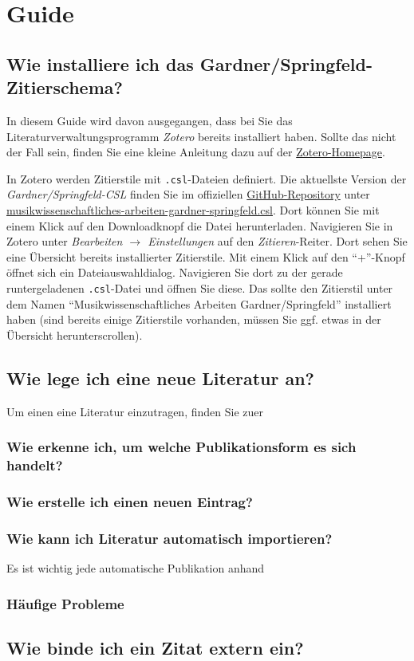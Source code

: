 \section{Guide}\label{guide}
\subsection{Wie installiere ich das Gardner/Springfeld-Zitierschema?}
In diesem Guide wird davon ausgegangen, dass bei Sie das Literaturverwaltungsprogramm \textit{Zotero} bereits installiert haben. Sollte das nicht der Fall sein, finden Sie eine kleine Anleitung dazu auf der \href{https://www.zotero.org/support/installation}{Zotero-Homepage}.

In Zotero werden Zitierstile mit \texttt{.csl}-Dateien definiert.
Die aktuellste Version der \textit{Gardner/Springfeld-CSL} finden Sie im offiziellen \href{https://github.com/digimuwi/MWA_csl}{GitHub-Re\-po\-si\-to\-ry}
unter
\href{https://github.com/digimuwi/MWA_csl/blob/main/musikwissenschaftliches-arbeiten-gardner-springfeld.csl}{musik\-wissen\-schaft\-liches-ar\-bei\-ten-gard\-ner-spring\-feld.csl}.
Dort k\"onnen Sie mit einem Klick auf den Downloadknopf die Datei herunterladen.
Navigieren Sie in Zotero unter \textit{Bearbeiten $\rightarrow$ Einstellungen} auf den \textit{Zitieren}-Reiter.
Dort sehen Sie eine \"Ubersicht bereits installierter Zitierstile. Mit einem Klick auf den "`+"'-Knopf \"offnet sich ein Dateiauswahldialog.
Navigieren Sie dort zu der gerade runtergeladenen \texttt{.csl}-Datei und \"offnen Sie diese.
Das sollte den Zitierstil unter dem Namen "`Musikwissenschaftliches Arbeiten Gardner/Springfeld"' installiert haben (sind bereits einige Zitierstile vorhanden, m\"ussen Sie ggf. etwas in der \"Ubersicht herunterscrollen).
\newpage
\subsection{Wie lege ich eine neue Literatur an?}
Um einen eine Literatur einzutragen, finden Sie zuer
\subsubsection{Wie erkenne ich, um welche Publikationsform es sich handelt?}
\subsubsection{Wie erstelle ich einen neuen Eintrag?}
\subsubsection{Wie kann ich Literatur automatisch importieren?}
Es ist wichtig jede automatische Publikation anhand 
\subsubsection{H\"aufige Probleme}\label{haeufige_probleme}
\subsection{Wie binde ich ein Zitat extern ein?}

